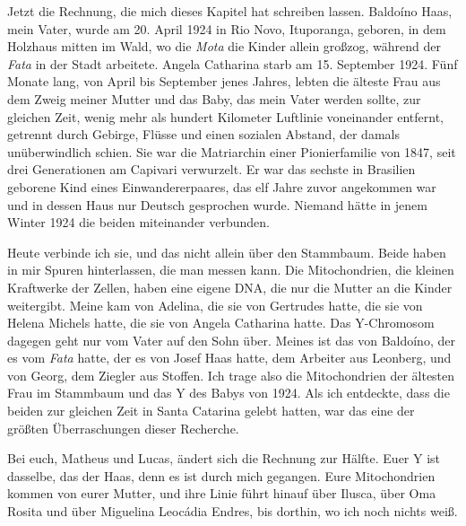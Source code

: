 \documentclass[
  ngerman,
  11pt,
  openany]{book}
\begin{document}
Jetzt die Rechnung, die mich dieses Kapitel hat schreiben lassen.
Baldoíno Haas, mein Vater, wurde am 20. April 1924 in Rio Novo,
Ituporanga, geboren, in dem Holzhaus mitten im Wald, wo die \emph{Mota}
die Kinder allein großzog, während der \emph{Fata} in der Stadt
arbeitete. Angela Catharina starb am 15. September 1924. Fünf Monate
lang, von April bis September jenes Jahres, lebten die älteste Frau aus
dem Zweig meiner Mutter und das Baby, das mein Vater werden sollte, zur
gleichen Zeit, wenig mehr als hundert Kilometer Luftlinie voneinander
entfernt, getrennt durch Gebirge, Flüsse und einen sozialen Abstand, der
damals unüberwindlich schien. Sie war die Matriarchin einer
Pionierfamilie von 1847, seit drei Generationen am Capivari verwurzelt.
Er war das sechste in Brasilien geborene Kind eines Einwandererpaares,
das elf Jahre zuvor angekommen war und in dessen Haus nur Deutsch
gesprochen wurde. Niemand hätte in jenem Winter 1924 die beiden
miteinander verbunden.

Heute verbinde ich sie, und das nicht allein über den Stammbaum. Beide
haben in mir Spuren hinterlassen, die man messen kann. Die
Mitochondrien, die kleinen Kraftwerke der Zellen, haben eine eigene DNA,
die nur die Mutter an die Kinder weitergibt. Meine kam von Adelina, die
sie von Gertrudes hatte, die sie von Helena Michels hatte, die sie von
Angela Catharina hatte. Das Y-Chromosom dagegen geht nur vom Vater auf
den Sohn über. Meines ist das von Baldoíno, der es vom \emph{Fata}
hatte, der es von Josef Haas hatte, dem Arbeiter aus Leonberg, und von
Georg, dem Ziegler aus Stoffen. Ich trage also die Mitochondrien der
ältesten Frau im Stammbaum und das Y des Babys von 1924. Als ich
entdeckte, dass die beiden zur gleichen Zeit in Santa Catarina gelebt
hatten, war das eine der größten Überraschungen dieser Recherche.

Bei euch, Matheus und Lucas, ändert sich die Rechnung zur Hälfte. Euer Y
ist dasselbe, das der Haas, denn es ist durch mich gegangen. Eure
Mitochondrien kommen von eurer Mutter, und ihre Linie führt hinauf über
Ilusca, über Oma Rosita und über Miguelina Leocádia Endres, bis dorthin,
wo ich noch nichts weiß.
\end{document}
